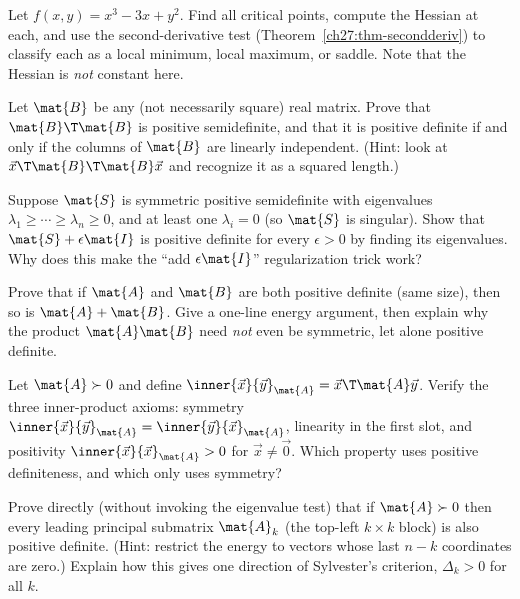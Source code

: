 \begin{exercise}
\label{ch27:ex-classify}
Let $f(x,y) = x^3 - 3x + y^2$. Find all critical points, compute the Hessian at each, and use the
second-derivative test (Theorem~\ref{ch27:thm-secondderiv}) to classify each as a local minimum,
local maximum, or saddle. Note that the Hessian is \emph{not} constant here.
\end{exercise}

\begin{exercise}
\label{ch27:ex-ata}
Let $\mat{B}$ be any (not necessarily square) real matrix. Prove that $\mat{B}\T\mat{B}$ is positive
semidefinite, and that it is positive definite if and only if the columns of $\mat{B}$ are linearly
independent. (Hint: look at $\vec{x}\T\mat{B}\T\mat{B}\vec{x}$ and recognize it as a squared length.)
\end{exercise}

\begin{exercise}
\label{ch27:ex-reg}
Suppose $\mat{S}$ is symmetric positive semidefinite with eigenvalues $\lambda_1\geq\cdots\geq
\lambda_n\geq 0$, and at least one $\lambda_i = 0$ (so $\mat{S}$ is singular). Show that
$\mat{S}+\epsilon\mat{I}$ is positive definite for every $\epsilon>0$ by finding its eigenvalues.
Why does this make the ``add $\epsilon\mat{I}$'' regularization trick work?
\end{exercise}

\begin{exercise}
\label{ch27:ex-sum}
Prove that if $\mat{A}$ and $\mat{B}$ are both positive definite (same size), then so is
$\mat{A}+\mat{B}$. Give a one-line energy argument, then explain why the product $\mat{A}\mat{B}$
need \emph{not} even be symmetric, let alone positive definite.
\end{exercise}

\begin{exercise}
\label{ch27:ex-innerproduct}
Let $\mat{A}\succ0$ and define $\inner{\vec{x}}{\vec{y}}_{\mat{A}} = \vec{x}\T\mat{A}\vec{y}$.
Verify the three inner-product axioms: symmetry $\inner{\vec{x}}{\vec{y}}_{\mat{A}} =
\inner{\vec{y}}{\vec{x}}_{\mat{A}}$, linearity in the first slot, and positivity
$\inner{\vec{x}}{\vec{x}}_{\mat{A}} > 0$ for $\vec{x}\neq\vec{0}$. Which property uses positive
definiteness, and which only uses symmetry?
\end{exercise}

\begin{exercise}
\label{ch27:ex-challenge}
Prove directly (without invoking the eigenvalue test) that if $\mat{A}\succ0$ then every leading
principal submatrix $\mat{A}_k$ (the top-left $k\times k$ block) is also positive definite. (Hint:
restrict the energy to vectors whose last $n-k$ coordinates are zero.) Explain how this gives one
direction of Sylvester's criterion, $\Delta_k>0$ for all $k$.
\end{exercise}
